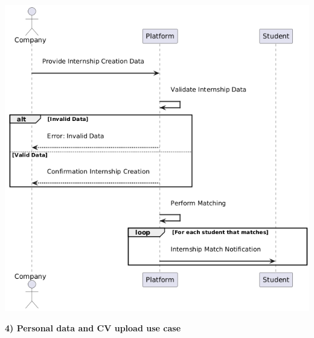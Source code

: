 \begin{center}
    \includegraphics[scale = 0.8]{Images/ImagesRASD/Internship_post_creation_use_case.png}
\end{center}

\newpage
\textbf{4) Personal data and CV upload use case}\\

